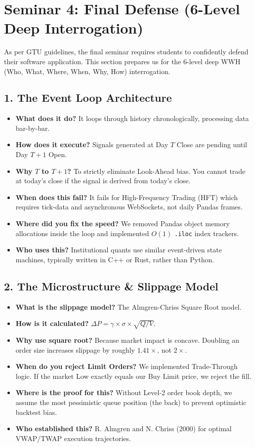\documentclass[12pt,a4paper]{article}
\begin{document}
\section{Seminar 4: Final Defense (6-Level Deep Interrogation)}
As per GTU guidelines, the final seminar requires students to confidently defend their software application. This section prepares us for the 6-level deep WWH (Who, What, Where, When, Why, How) interrogation.

\subsection{1. The Event Loop Architecture}
\begin{itemize}
    \item \textbf{What does it do?} It loops through history chronologically, processing data bar-by-bar.
    \item \textbf{How does it execute?} Signals generated at Day $T$ Close are pending until Day $T+1$ Open.
    \item \textbf{Why $T$ to $T+1$?} To strictly eliminate Look-Ahead bias. You cannot trade at today's close if the signal is derived from today's close.
    \item \textbf{When does this fail?} It fails for High-Frequency Trading (HFT) which requires tick-data and asynchronous WebSockets, not daily Pandas frames.
    \item \textbf{Where did you fix the speed?} We removed Pandas object memory allocations inside the loop and implemented $O(1)$ \texttt{.iloc} index trackers.
    \item \textbf{Who uses this?} Institutional quants use similar event-driven state machines, typically written in C++ or Rust, rather than Python.
\end{itemize}

\subsection{2. The Microstructure \& Slippage Model}
\begin{itemize}
    \item \textbf{What is the slippage model?} The Almgren-Chriss Square Root model.
    \item \textbf{How is it calculated?} $\Delta P = \gamma \times \sigma \times \sqrt{Q / V}$.
    \item \textbf{Why use square root?} Because market impact is concave. Doubling an order size increases slippage by roughly $1.41\times$, not $2\times$.
    \item \textbf{When do you reject Limit Orders?} We implemented Trade-Through logic. If the market Low exactly equals our Buy Limit price, we reject the fill.
    \item \textbf{Where is the proof for this?} Without Level-2 order book depth, we assume the most pessimistic queue position (the back) to prevent optimistic backtest bias.
    \item \textbf{Who established this?} R. Almgren and N. Chriss (2000) for optimal VWAP/TWAP execution trajectories.
\end{itemize}
\end{document}
